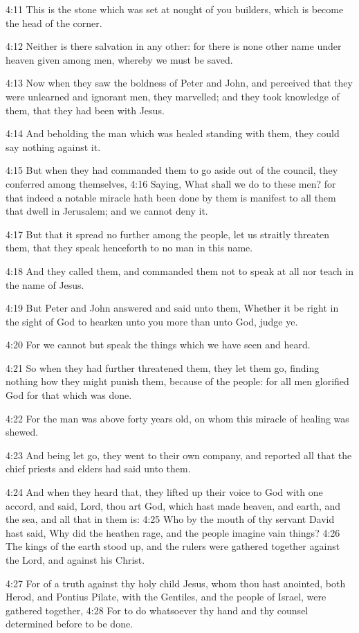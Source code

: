 4:11 This is the stone which was set at nought of you builders, which
is become the head of the corner.

4:12 Neither is there salvation in any other: for there is none other
name under heaven given among men, whereby we must be saved.

4:13 Now when they saw the boldness of Peter and John, and perceived
that they were unlearned and ignorant men, they marvelled; and they
took knowledge of them, that they had been with Jesus.

4:14 And beholding the man which was healed standing with them, they
could say nothing against it.

4:15 But when they had commanded them to go aside out of the council,
they conferred among themselves, 4:16 Saying, What shall we do to
these men? for that indeed a notable miracle hath been done by them is
manifest to all them that dwell in Jerusalem; and we cannot deny it.

4:17 But that it spread no further among the people, let us straitly
threaten them, that they speak henceforth to no man in this name.

4:18 And they called them, and commanded them not to speak at all nor
teach in the name of Jesus.

4:19 But Peter and John answered and said unto them, Whether it be
right in the sight of God to hearken unto you more than unto God,
judge ye.

4:20 For we cannot but speak the things which we have seen and heard.

4:21 So when they had further threatened them, they let them go,
finding nothing how they might punish them, because of the people: for
all men glorified God for that which was done.

4:22 For the man was above forty years old, on whom this miracle of
healing was shewed.

4:23 And being let go, they went to their own company, and reported
all that the chief priests and elders had said unto them.

4:24 And when they heard that, they lifted up their voice to God with
one accord, and said, Lord, thou art God, which hast made heaven, and
earth, and the sea, and all that in them is: 4:25 Who by the mouth of
thy servant David hast said, Why did the heathen rage, and the people
imagine vain things?  4:26 The kings of the earth stood up, and the
rulers were gathered together against the Lord, and against his
Christ.

4:27 For of a truth against thy holy child Jesus, whom thou hast
anointed, both Herod, and Pontius Pilate, with the Gentiles, and the
people of Israel, were gathered together, 4:28 For to do whatsoever
thy hand and thy counsel determined before to be done.

